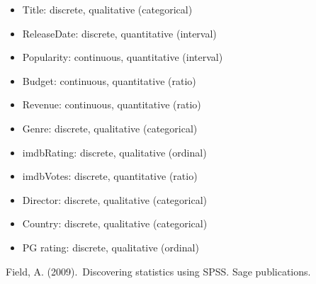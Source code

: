 \documentclass[a4paper]{article}
\begin{document}
	\begin{itemize}
		\item Title: discrete, qualitative (categorical)
		\item ReleaseDate: discrete, quantitative (interval)
		\item Popularity: continuous, quantitative (interval)
		\item Budget: continuous, quantitative (ratio)
		\item Revenue: continuous, quantitative (ratio)
		\item Genre: discrete, qualitative (categorical)
		\item imdbRating: discrete, qualitative (ordinal)
		\item imdbVotes: discrete, quantitative (ratio) 
		\item Director: discrete, qualitative (categorical) 
		\item Country: discrete, qualitative (categorical) 
		\item PG rating: discrete, qualitative (ordinal)
	\end{itemize}


\newpage
\begin{thebibliography}{9}
	Field, A. (2009). Discovering statistics using SPSS. Sage publications. 
	
\end{thebibliography}
\end{document}

